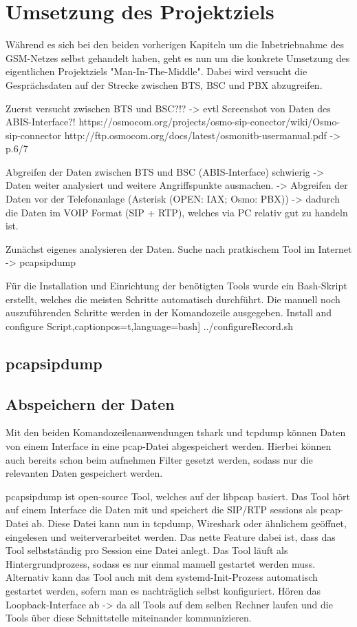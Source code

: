\section{Umsetzung des Projektziels}
Während es sich bei den beiden vorherigen Kapiteln um die Inbetriebnahme des GSM-Netzes selbst gehandelt haben, geht es nun um die konkrete Umsetzung des eigentlichen Projektziels "Man-In-The-Middle". Dabei wird versucht die Gesprächsdaten auf der Strecke zwischen BTS, BSC und PBX abzugreifen.

Zuerst versucht zwischen BTS und BSC?!?
-> evtl Screenshot von Daten des ABIS-Interface?!
https://osmocom.org/projects/osmo-sip-conector/wiki/Osmo-sip-connector
http://ftp.osmocom.org/docs/latest/osmonitb-usermanual.pdf -> p.6/7

Abgreifen der Daten zwischen BTS und BSC (ABIS-Interface) schwierig -> Daten weiter analysiert und weitere Angriffspunkte ausmachen.
-> Abgreifen der Daten vor der Telefonanlage (Asterisk (OPEN: IAX; Osmo: PBX)) -> dadurch die Daten im VOIP Format (SIP + RTP), welches via PC relativ gut zu handeln ist.

Zunächst eigenes analysieren der Daten. Suche nach pratkischem Tool im Internet
-> pcapsipdump

Für die Installation und Einrichtung der benötigten Tools wurde ein Bash-Skript erstellt, welches die meisten Schritte automatisch durchführt. Die manuell noch auszuführenden Schritte werden in der Komandozeile ausgegeben.
{Install and configure Script}\label{lst:configure.sh},captionpos=t,language=bash]
{../configureRecord.sh}


\subsection{pcapsipdump}
\subsection{Abspeichern der Daten}
Mit den beiden Komandozeilenanwendungen tshark und tcpdump können Daten von einem Interface in eine pcap-Datei abgespeichert werden. Hierbei können auch bereits schon beim aufnehmen Filter gesetzt werden, sodass nur die relevanten Daten gespeichert werden.


pcapsipdump ist open-source Tool, welches auf der libpcap basiert. Das Tool hört auf einem Interface die Daten mit und speichert die SIP/RTP sessions als pcap-Datei ab. Diese Datei kann nun in tcpdump, Wireshark oder ähnlichem geöffnet, eingelesen und weiterverarbeitet werden. Das nette Feature dabei ist, dass das Tool selbstständig pro Session eine Datei anlegt. Das Tool läuft als Hintergrundprozess, sodass es nur einmal manuell gestartet werden muss. Alternativ kann das Tool auch mit dem systemd-Init-Prozess automatisch gestartet werden, sofern man es nachträglich selbst konfiguriert.
Hören das Loopback-Interface ab -> da all Tools auf dem selben Rechner laufen und die Tools über diese Schnittstelle miteinander kommunizieren.

